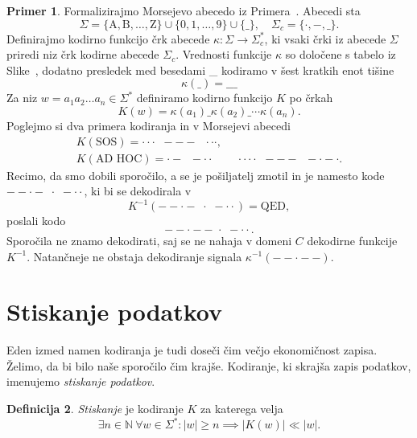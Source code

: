 \documentclass{amsart}
\newcommand{\N}{\mathbb{N}}
\theoremstyle{definition} %
\newtheorem{definicija}{Definicija}[section]
\newtheorem{primer}[definicija]{Primer}
\theoremstyle{plain} %
\begin{document}
\begin{primer}
    
    Formalizirajmo Morsejevo abecedo iz Primera~. Abecedi sta
    \[
        \Sigma = \{ \text{A},  \text{B}, \ldots, \text{Z} \} \cup \{ 0, 1, \ldots, 9 \} \cup \{ \_ \}, \quad
        \Sigma_c = \{ \cdot ,-, \_ \}.
    \]
    Definirajmo kodirno funkcijo črk abecede $ \kappa \colon \Sigma \to \Sigma_c^* $, ki vsaki črki iz abecede
    $ \Sigma $ priredi niz črk kodirne abecede $ \Sigma_c $. Vrednosti funkcije $ \kappa $ so določene s
    tabelo iz Slike~, dodatno presledek med besedami \_  kodiramo v šest kratkih enot tišine 
    \[
        \kappa(\_) = \_\_\_
    \]
    Za niz $ w = a_1a_2 \ldots a_n \in \Sigma^* $ definiramo kodirno 
    funkcijo $ K $ po črkah
    \[
        K(w) = \kappa(a_1)\_\kappa(a_2)\_\cdots\kappa(a_n).
    \]
    Poglejmo si dva primera kodiranja in v Morsejevi abecedi
    \begin{gather*}
        K(\text{SOS}) = \cdot\cdot\cdot \;\; --- \;\; \cdot\cdot\cdot, \\
        K(\text{AD HOC}) = \cdot- \;\; -\cdot\cdot \qquad \cdot\cdot\cdot\cdot \;\; --- \;\; -\cdot-\cdot.
    \end{gather*}
    Recimo, da smo dobili sporočilo, a se je pošiljatelj zmotil in je namesto kode 
    $ --\cdot- \,\, \cdot \,\, -\cdot\cdot $, ki bi se dekodirala v
    \[
        K^{-1}(--\cdot- \,\, \cdot \,\, -\cdot\cdot) = \text{QED},
        \]
    poslali kodo
    \[
        --\cdot-- \,\, \cdot \,\, -\cdot\cdot.
    \]
    Sporočila ne znamo dekodirati, saj se ne nahaja v domeni $ C $ dekodirne funkcije $ K^{-1} $.
    Natančneje ne obstaja dekodiranje signala $ \kappa^{-1}(--\cdot--) $.

\end{primer}

\section{Stiskanje podatkov}

Eden izmed namen kodiranja je tudi doseči čim večjo ekonomičnost zapisa. Želimo, da bi bilo naše sporočilo
čim krajše. Kodiranje, ki skrajša zapis podatkov, imenujemo \textit{stiskanje podatkov}.

\begin{definicija}
    
    \textit{Stiskanje} je kodiranje $ K $ za katerega velja 
    \[ 
    \exists n \in \N \ \forall w \in \Sigma^* \colon |w| \geq n \implies
    \left\lvert K(w)\right\rvert \ll \left\lvert w \right\rvert.
    \]

\end{definicija}
\end{document}
